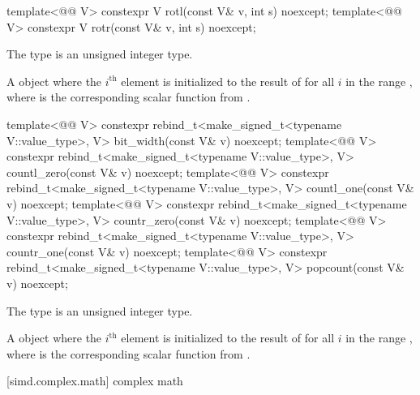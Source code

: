 \begin{itemdecl}
template<@@ V> constexpr V rotl(const V& v, int s) noexcept;
template<@@ V> constexpr V rotr(const V& v, int s) noexcept;
\end{itemdecl}

\begin{itemdescr}
\pnum
\constraints
The type  is an unsigned integer type.

\pnum
\returns
A  object where the $i^\text{th}$ element is initialized to
the result of  for all $i$ in the
range , where  is the corresponding
scalar function from .
\end{itemdescr}

\begin{itemdecl}
template<@@ V>
  constexpr rebind_t<make_signed_t<typename V::value_type>, V> bit_width(const V& v) noexcept;
template<@@ V>
  constexpr rebind_t<make_signed_t<typename V::value_type>, V> countl_zero(const V& v) noexcept;
template<@@ V>
  constexpr rebind_t<make_signed_t<typename V::value_type>, V> countl_one(const V& v) noexcept;
template<@@ V>
  constexpr rebind_t<make_signed_t<typename V::value_type>, V> countr_zero(const V& v) noexcept;
template<@@ V>
  constexpr rebind_t<make_signed_t<typename V::value_type>, V> countr_one(const V& v) noexcept;
template<@@ V>
  constexpr rebind_t<make_signed_t<typename V::value_type>, V> popcount(const V& v) noexcept;
\end{itemdecl}

\begin{itemdescr}
\pnum
\constraints
The type  is an unsigned integer type.

\pnum
\returns
A  object where the $i^\text{th}$ element is initialized to
the result of  for all $i$ in the range
, where  is the corresponding scalar
function from .
\end{itemdescr}

[simd.complex.math]{ complex math}

